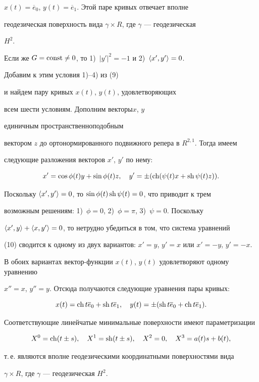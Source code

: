 \begin{pf}
$x(t)= \overline e_0$, $y(t)= \overline e_1$.  Этой паре кривых отвечает вполне 


геодезическая поверхность вида $ \gamma \times R$, где $\gamma$ --- геодезическая 


$H^2$. 





Если же $G=\operatorname{const} \neq 0$, то 1)~$|y'|^2=-1$ и 2)~$\langle x',y'\rangle=0$. 


Добавим к этим условия 1)--4) из (9) 


и найдем пару кривых $x(t)$, $y(t)$, удовлетворяющих 


всем  шести условиям. Дополним векторы\linebreak $x$, $y$ 


единичным пространственноподобным 


вектором $z$ до ортонормированного подвижного репера в $R^{2,1}$. Тогда имеем 


следующие разложения векторов $x'$, $y'$ по нему:


\begin{equation}


x'= \cos \phi (t)y+ \sin \phi (t)z,\quad


y'= \pm (\ch( \psi (t)x+  \sh \psi (t)z)).


\end{equation}





Поскольку $\langle x',y'\rangle=0$, то $\sin \phi (t)\operatorname{sh} \psi (t)=0$, что приводит к трем 


возможным решениям: 1)~$\phi =0$, 2)~$\phi = \pi $, 3)~$ \psi =0$. Поскольку 


$\langle x',y\rangle+\langle x,y'\rangle=0$, то нетрудно убедиться в том, что система уравнений 


(10) сводится к одному из двух вариантов: $x'=y$, $y'=x$ или $x'=-y$, $y'=-x$.


В обоих вариантах вектор-функции $x(t)$, $y(t)$ удовлетворяют одному уравнению


$x''=x$, $y''=y$. Отсюда получаются  следующие уравнения пары кривых: 


$$


x(t)=\ch t \overline e_0+\sh t \overline e_1,\quad


y(t)= \pm ( \sh t \overline e_0+ \ch t \overline e_1).


$$





Соответствующие линейчатые минимальные поверхности имеют параметризации 


$$


X^0=\ch(t \pm s),\quad X^1=\sh(t \pm s),\quad X^2=0,\quad X^3=a(t)s+b(t),


$$


т.\,е. являются вполне геодезическими координатными поверхностями вида 


$\gamma  \times R$, где $ \gamma $ --- геодезическая $H^2$.


\end{pf}





